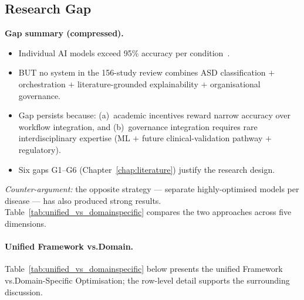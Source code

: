 \subsection{Research Gap}
\label{sec:research_gap}

\noindent\textbf{Gap summary (compressed).}
\begin{itemize}[leftmargin=*, itemsep=2pt]
    \item Individual AI models exceed 95\% accuracy per condition~\cite{esteva2019guide, topol2019deep}.
    \item BUT no system in the 156-study review combines ASD classification $+$ orchestration $+$ literature-grounded explainability $+$ organisational governance.
    \item Gap persists because: (a)~academic incentives reward narrow accuracy over workflow integration, and (b)~governance integration requires rare interdisciplinary expertise (ML $+$ future clinical-validation pathway $+$ regulatory).
    \item Six gaps G1--G6 (Chapter~\ref{chap:literature}) justify the research design.
\end{itemize}

\noindent\textit{Counter-argument:} the opposite strategy --- separate highly-optimised models per disease --- has also produced strong results. Table~\ref{tab:unified_vs_domainspecific} compares the two approaches across five dimensions.

\paragraph{Unified Framework vs.Domain.}



\noindent Table~\ref{tab:unified_vs_domainspecific} below presents the unified Framework vs.Domain-Specific Optimisation; the row-level detail supports the surrounding discussion.

